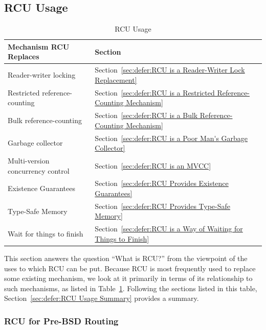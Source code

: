 
\subsection{RCU Usage}
\label{sec:defer:RCU Usage}

\begin{table}[tb]
\renewcommand*{\arraystretch}{1.2}
\centering
\small
\begin{tabular}{ll}
\toprule
Mechanism RCU Replaces & Section \\
\midrule
Reader-writer locking &
	Section~\ref{sec:defer:RCU is a Reader-Writer Lock Replacement} \\
Restricted reference-counting &
	Section~\ref{sec:defer:RCU is a Restricted Reference-Counting Mechanism} \\
Bulk reference-counting &
	Section~\ref{sec:defer:RCU is a Bulk Reference-Counting Mechanism} \\
Garbage collector &
	Section~\ref{sec:defer:RCU is a Poor Man's Garbage Collector} \\
Multi-version concurrency control &
	Section~\ref{sec:defer:RCU is an MVCC} \\
Existence Guarantees &
	Section~\ref{sec:defer:RCU Provides Existence Guarantees} \\
Type-Safe Memory &
	Section~\ref{sec:defer:RCU Provides Type-Safe Memory} \\
Wait for things to finish &
	Section~\ref{sec:defer:RCU is a Way of Waiting for Things to Finish} \\
\bottomrule
\end{tabular}
\caption{RCU Usage}
\label{tab:defer:RCU Usage}
\end{table}

This section answers the question ``What is RCU?'' from the viewpoint
of the uses to which RCU can be put.
Because RCU is most frequently used to replace some existing mechanism,
we look at it primarily in terms of its relationship to such mechanisms,
as listed in Table~\ref{tab:defer:RCU Usage}.
Following the sections listed in this table,
Section~\ref{sec:defer:RCU Usage Summary} provides a summary.

\subsubsection{RCU for Pre-BSD Routing}
\label{sec:defer:RCU for Pre-BSD Routing}

